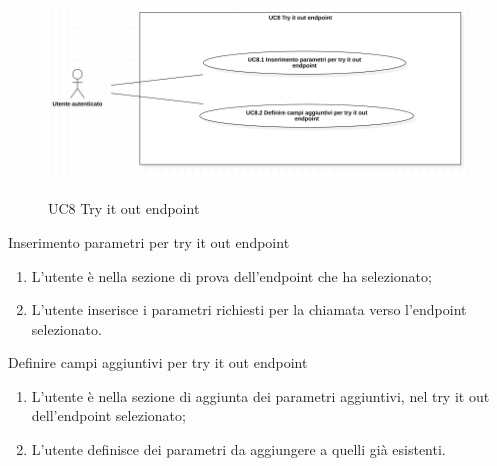 \begin{figure}[!ht] 
    \centering 
    \includegraphics[width=0.9\columnwidth, alt={Caso d'uso relativo alla prova di un endpoint}]{images/usecase/UC8.jpg}
    \caption{UC8 Try it out endpoint}\label{fig:uc:try-it-out-endpoint}
\end{figure}

\newpage


\begin{usecase}{8.1}{Inserimento parametri per try it out endpoint}\label{uc:inserimento-parametri-try-it-out-endpoint}

    \usecasemain{}
        \begin{enumerate}
            \item L'utente è nella sezione di prova dell'endpoint che ha selezionato;
            \item L'utente inserisce i parametri richiesti per la chiamata verso l'endpoint selezionato.
        \end{enumerate}

\end{usecase}


\begin{usecase}{8.2}{Definire campi aggiuntivi per try it out endpoint}\label{uc:definire-campi-try-it-out-endpoint}

    \usecasemain{}
        \begin{enumerate}
            \item L'utente è nella sezione di aggiunta dei parametri aggiuntivi, nel try it out dell'endpoint selezionato;
            \item L'utente definisce dei parametri da aggiungere a quelli già esistenti.
        \end{enumerate}

\end{usecase}

